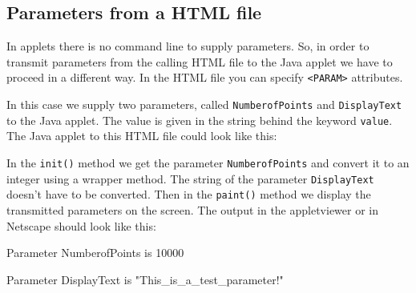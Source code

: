 \subsection{Parameters from a HTML file}
In applets there is no command line to supply parameters. 
So, in order to transmit 
parameters from the calling HTML file to the Java applet we have to
proceed in a different way.
In the HTML file you can
specify \verb|<PARAM>| attributes.

In this case we supply two parameters, called \verb|NumberofPoints| and
\verb|DisplayText| to the Java applet. The value is given in the string
behind the keyword \verb|value|. The Java applet to this HTML file
could look like this:


In the \verb|init()| method we get the parameter \verb|NumberofPoints|
and convert it to an integer using a wrapper method. The string 
of the parameter \verb|DisplayText| doesn't have
to be converted. Then in the \verb|paint()| method we display
the transmitted parameters on the screen. The output in the 
appletviewer or in Netscape should look like this:
\begin{sverbatim}
  Parameter NumberofPoints is 10000

  Parameter DisplayText is "This_is_a_test_parameter!"
\end{sverbatim}







